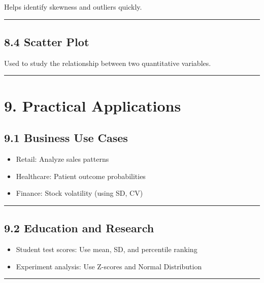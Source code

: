 \documentclass[
  letterpaper,
  DIV=11,
  numbers=noendperiod]{scrreprt}
\providecommand{\tightlist}{%
  \setlength{\itemsep}{0pt}\setlength{\parskip}{0pt}}
\begin{document}
Helps identify skewness and outliers quickly.

\begin{center}\rule{0.5\linewidth}{0.5pt}\end{center}

\subsection{8.4 Scatter Plot}\label{scatter-plot}

Used to study the relationship between two quantitative variables.

\begin{center}\rule{0.5\linewidth}{0.5pt}\end{center}

\section{9. Practical Applications}\label{practical-applications}

\subsection{9.1 Business Use Cases}\label{business-use-cases}

\begin{itemize}
\tightlist
\item
  Retail: Analyze sales patterns
\item
  Healthcare: Patient outcome probabilities
\item
  Finance: Stock volatility (using SD, CV)
\end{itemize}

\begin{center}\rule{0.5\linewidth}{0.5pt}\end{center}

\subsection{9.2 Education and Research}\label{education-and-research}

\begin{itemize}
\tightlist
\item
  Student test scores: Use mean, SD, and percentile ranking
\item
  Experiment analysis: Use Z-scores and Normal Distribution
\end{itemize}

\begin{center}\rule{0.5\linewidth}{0.5pt}\end{center}
\end{document}
